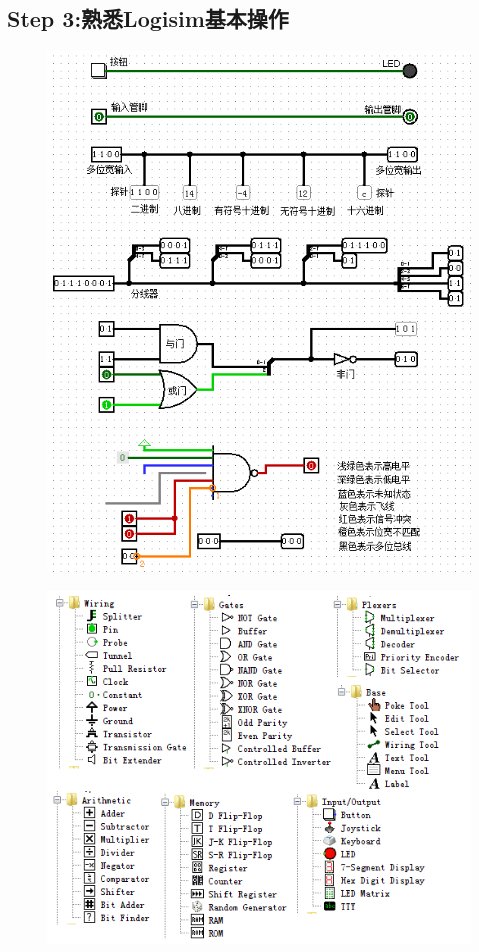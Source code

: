\documentclass{article}
\begin{document}
		\subsection*{Step 3:熟悉Logisim基本操作}
		\begin{figure}[H]
			\centering
			\includegraphics[scale=0.8]{b-3.png}
		\end{figure}
		\begin{figure}[H]
			\centering
			\includegraphics[scale=0.8]{b-4.png}
		\end{figure}
\end{document}
